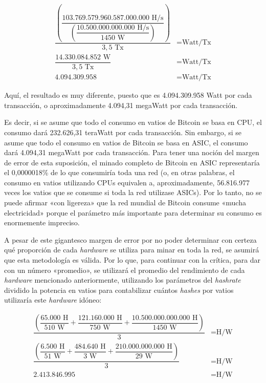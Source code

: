 \documentclass[12pt,a4paper,twoside]{book}
\begin{document}
\begin{align*}
\dfrac{\left( \dfrac{103.769.579.960.587.000.000 \text{ H/s}}{\left( \dfrac{10.500.000.000.000 \text{ H/s}}{1450 \text{ W}} \right)} \right)}{3,5 \text{ Tx}} &= \text{Watt/Tx} \\
\dfrac{14.330.084.852 \text{ W}}{3,5 \text{ Tx}} &= \text{Watt/Tx} \\
4.094.309.958 &= \text{Watt/Tx}
\end{align*}

Aquí, el resultado es muy diferente, puesto que es 4.094.309.958 Watt por cada transacción, o aproximadamente 4.094,31 megaWatt por cada transacción.

Es decir, si se asume que todo el consumo en vatios de Bitcoin se basa en CPU, el consumo dará 232.626,31 teraWatt por cada transacción. Sin embargo, si se asume que todo el consumo en vatios de Bitcoin se basa en ASIC, el consumo dará 4.094,31 megaWatt por cada transacción. Para tener una noción del margen de error de esta suposición, el minado completo de Bitcoin en ASIC representaría el 0,0000018\% de lo que consumiría toda una red (o, en otras palabras, el consumo en vatios utilizando CPUs equivalen a, aproximadamente, 56.816.977 veces los vatios que se consume si toda la red utilizase ASICs). Por lo tanto, no se puede afirmar «con ligereza» que la red mundial de Bitcoin consume «mucha electricidad» porque el parámetro más importante para determinar su consumo es enormemente impreciso.

A pesar de este gigantesco margen de error por no poder determinar con certeza qué proporción de cada \textit{hardware} se utiliza para minar en toda la red, se asumirá que esta metodología es válida. Por lo que, para continuar con la crítica, para dar con un número «promedio», se utilizará el promedio del rendimiento de cada \textit{hardware} mencionado anteriormente, utilizando los parámetros del \textit{hashrate} dividido la potencia en vatios para contabilizar cuántos \textit{hashes} por vatios utilizaría este \textit{hardware} idóneo:

\begin{align*}
\dfrac{\left( \dfrac{65.000 \text{ H}}{510\text{ W}} + \dfrac{121.160.000 \text{ H}}{750\text{ W}} + \dfrac{10.500.000.000.000 \text{ H}}{1450\text{ W}} \right)}{3} &= \text{H/W} \\
\dfrac{\left( \dfrac{6.500 \text{ H}}{51 \text{ W}} + \dfrac{484.640\text{ H}}{3\text{ W}} + \dfrac{210.000.000.000\text{ H}}{29\text{ W}} \right)}{3} &= \text{H/W} \\
2.413.846.995 &= \text{H/W}
\end{align*}
\end{document}
